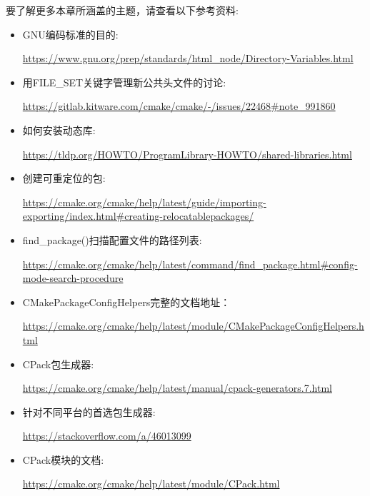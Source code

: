要了解更多本章所涵盖的主题，请查看以下参考资料:

\begin{itemize}
\item 
GNU编码标准的目的:

\url{https://www.gnu.org/prep/standards/html_node/Directory-Variables.html}

\item 
用FILE\_SET关键字管理新公共头文件的讨论:

\url{https://gitlab.kitware.com/cmake/cmake/-/issues/22468\#note_991860}

\item 
如何安装动态库:

\url{https://tldp.org/HOWTO/ProgramLibrary-HOWTO/shared-libraries.html}

\item 
创建可重定位的包:

\url{https://cmake.org/cmake/help/latest/guide/importing-exporting/index.html\#creating-relocatablepackages/}

\item 
find\_package()扫描配置文件的路径列表:

\url{https://cmake.org/cmake/help/latest/command/find_package.html\#config-mode-search-procedure}

\item 
CMakePackageConfigHelpers完整的文档地址：

\url{https://cmake.org/cmake/help/latest/module/CMakePackageConfigHelpers.html}

\item 
CPack包生成器:

\url{https://cmake.org/cmake/help/latest/manual/cpack-generators.7.html}

\item 
针对不同平台的首选包生成器: 

\url{https://stackoverflow.com/a/46013099}

\item 
CPack模块的文档:

\url{https://cmake.org/cmake/help/latest/module/CPack.html}
\end{itemize}